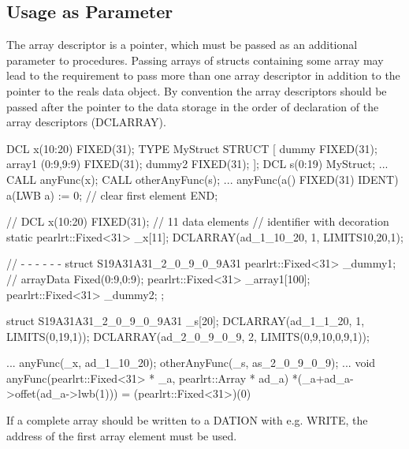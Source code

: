 \subsection{Usage as Parameter}
The array descriptor is a pointer, which must be passed as an additional parameter
to procedures. 
Passing arrays of structs containing some array may lead to the requirement
to pass more than one array descriptor in addition to the pointer to the 
reals data object.
By convention the array descriptors should be passed after the pointer to the
data storage in the order of declaration of the array descriptors (DCLARRAY).

\begin{PEARLCode}
DCL x(10:20) FIXED(31); 
TYPE MyStruct STRUCT [
           dummy FIXED(31);
           array1 (0:9,9:9) FIXED(31);
           dummy2 FIXED(31);
           ];
DCL s(0:19) MyStruct;
...
CALL anyFunc(x);
CALL otherAnyFunc(s);
...
anyFunc(a() FIXED(31) IDENT) 
   a(LWB a) := 0;  // clear first element
END;
\end{PEARLCode}

\begin{CppCode}
// DCL x(10:20) FIXED(31); 
 // 11 data elements
 // identifier with decoration
static pearlrt::Fixed<31> _x[11];
DCLARRAY(ad_1_10_20, 1, LIMITS{{10,20,1}});

// - - - - - - 
   struct S19A31A31_2_0_9_0_9A31 {
      pearlrt::Fixed<31> _dummy1;
                       // arrayData Fixed(0:9,0:9);
      pearlrt::Fixed<31> _array1[100]; 
      pearlrt::Fixed<31> _dummy2;
   };

   struct S19A31A31_2_0_9_0_9A31  _s[20]; 
   DCLARRAY(ad_1_1_20, 1, LIMITS({{0,19,1}}));
   DCLARRAY(ad_2_0_9_0_9, 2, LIMITS({{0,9,10},{0,9,1}}));

...
   anyFunc(_x, ad_1_10_20);
   otherAnyFunc(_s, as_2_0_9_0_9);
...
void anyFunc(pearlrt::Fixed<31> * _a,
             pearlrt::Array * ad_a) {
  *(_a+ad_a->offet(ad_a->lwb(1))) =
          (pearlrt::Fixed<31>)(0)
}
\end{CppCode}

If a complete array should be written to a DATION with e.g. WRITE,
the address of the first array element must be used.


